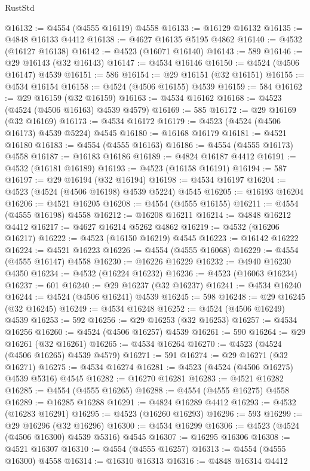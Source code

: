 \begin{lexlean}{RustStd}
\begin{coremodule}
@16132 := @4554 (@4555 @16119) @4558
@16133 := @16129 @16132
@16135 := @4848 @16133 @4412
@16138 := @4627 @16135 @5195 @4862
@16140 := @4532 (@16127 @16138)
@16142 := @4523 (@16071 @16140)
@16143 := 589
@16146 := @29 @16143 (@32 @16143)
@16147 := @4534 @16146
@16150 := @4524 (@4506 @16147) @4539
@16151 := 586
@16154 := @29 @16151 (@32 @16151)
@16155 := @4534 @16154
@16158 := @4524 (@4506 @16155) @4539
@16159 := 584
@16162 := @29 @16159 (@32 @16159)
@16163 := @4534 @16162
@16168 := @4523 (@4524 (@4506 @16163) @4539 @4579)
@16169 := 585
@16172 := @29 @16169 (@32 @16169)
@16173 := @4534 @16172
@16179 := @4523 (@4524 (@4506 @16173) @4539 @5224) @4545
@16180 := @16168 @16179
@16181 := @4521 @16180
@16183 := @4554 (@4555 @16163)
@16186 := @4554 (@4555 @16173) @4558
@16187 := @16183 @16186
@16189 := @4824 @16187 @4412
@16191 := @4532 (@16181 @16189)
@16193 := @4523 (@16158 @16191)
@16194 := 587
@16197 := @29 @16194 (@32 @16194)
@16198 := @4534 @16197
@16204 := @4523 (@4524 (@4506 @16198) @4539 @5224) @4545
@16205 := @16193 @16204
@16206 := @4521 @16205
@16208 := @4554 (@4555 @16155)
@16211 := @4554 (@4555 @16198) @4558
@16212 := @16208 @16211
@16214 := @4848 @16212 @4412
@16217 := @4627 @16214 @5262 @4862
@16219 := @4532 (@16206 @16217)
@16222 := @4523 (@16150 @16219) @4545
@16223 := @16142 @16222
@16224 := @4521 @16223
@16226 := @4554 (@4555 @16068)
@16229 := @4554 (@4555 @16147) @4558
@16230 := @16226 @16229
@16232 := @4940 @16230 @4350
@16234 := @4532 (@16224 @16232)
@16236 := @4523 (@16063 @16234)
@16237 := 601
@16240 := @29 @16237 (@32 @16237)
@16241 := @4534 @16240
@16244 := @4524 (@4506 @16241) @4539
@16245 := 598
@16248 := @29 @16245 (@32 @16245)
@16249 := @4534 @16248
@16252 := @4524 (@4506 @16249) @4539
@16253 := 592
@16256 := @29 @16253 (@32 @16253)
@16257 := @4534 @16256
@16260 := @4524 (@4506 @16257) @4539
@16261 := 590
@16264 := @29 @16261 (@32 @16261)
@16265 := @4534 @16264
@16270 := @4523 (@4524 (@4506 @16265) @4539 @4579)
@16271 := 591
@16274 := @29 @16271 (@32 @16271)
@16275 := @4534 @16274
@16281 := @4523 (@4524 (@4506 @16275) @4539 @5316) @4545
@16282 := @16270 @16281
@16283 := @4521 @16282
@16285 := @4554 (@4555 @16265)
@16288 := @4554 (@4555 @16275) @4558
@16289 := @16285 @16288
@16291 := @4824 @16289 @4412
@16293 := @4532 (@16283 @16291)
@16295 := @4523 (@16260 @16293)
@16296 := 593
@16299 := @29 @16296 (@32 @16296)
@16300 := @4534 @16299
@16306 := @4523 (@4524 (@4506 @16300) @4539 @5316) @4545
@16307 := @16295 @16306
@16308 := @4521 @16307
@16310 := @4554 (@4555 @16257)
@16313 := @4554 (@4555 @16300) @4558
@16314 := @16310 @16313
@16316 := @4848 @16314 @4412

\end{coremodule}
\end{lexlean}
